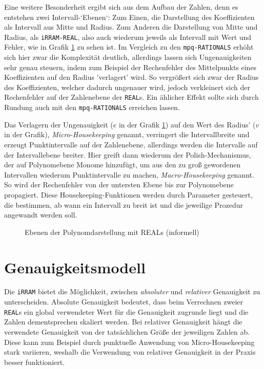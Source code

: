 Eine weitere Besonderheit ergibt sich aus dem Aufbau der Zahlen, denn es entstehen zwei Intervall-`Ebenen`: Zum Einen, die Darstellung des Koeffizienten als Intervall aus Mitte und Radius. Zum Anderen die Darstellung von Mitte und Radius, als \verb+iRRAM-REAL+, also auch wiederum jeweils als Intervall mit Wert und Fehler, wie in Grafik \ref{fig:levels} zu sehen ist. Im Vergleich zu den \verb+mpq-RATIONALS+ erhöht sich hier zwar die Komplexität deutlich, allerdings lassen sich Ungenauigkeiten sehr genau steuern, indem zum Beispiel der Rechenfehler des Mittelpunkts eines Koeffizienten auf den Radius 'verlagert' wird. So vergrößert sich zwar der Radius des Koeffizienten, welcher dadurch ungenauer wird, jedoch verkleinert sich der Rechenfehler auf der Zahlenebene der \verb+REAL+s. Ein ählicher Effekt sollte sich durch Rundung auch mit den \verb+mpq-RATIONALS+ erreichen lassen. 


Das Verlagern der Ungenauigkeit ($e$ in der Grafik \ref{fig:levels}) auf den Wert des Radius' ($v$ in der Grafik), \textit{Micro-Housekeeping} genannt, verringert die Intervallbreite und erzeugt Punktintervalle auf der Zahlenebene, allerdings werden die Intervalle auf der Intervallebene breiter. Hier greift dann wiederum der Polish-Mechanismus, der auf Polynomebene Monome hinzufügt, um aus den zu groß gewordenen Intervallen wiederum Punktintervalle zu machen, \textit{Macro-Housekeeping} genannt. So wird der Rechenfehler von der untersten Ebene bis zur Polynomebene propagiert.
Diese Housekeeping-Funktionen werden durch Parameter gesteuert, die bestimmen, ab wann ein Intervall zu breit ist und die jeweilige Prozedur angewandt werden soll.

\begin{figure}[ht]
\label{fig:levels}
\begin{center}
 
 
 \caption{Ebenen der Polynomdarstellung mit REALs (informell)}
 \end{center}
\end{figure}


\section{Genauigkeitsmodell}
\label{sec:precision}
Die \verb+iRRAM+ bietet die Möglichkeit, zwischen \textit{absoluter} und \textit{relativer} Genauigkeit zu unterscheiden. Absolute Genauigkeit bedeutet, dass beim Verrechnen zweier \verb+REAL+s ein global verwendeter Wert für die Genauigkeit zugrunde liegt und die Zahlen dementsprechen skaliert werden. Bei relativer Genauigkeit hängt die verwendete Genauigkeit von der tatsächlichen Größe der jeweiligen Zahlen ab. Diese kann zum Beispiel durch punktuelle Anwendung von Micro-Housekeeping stark variieren, weshalb die Verwendung von relativer Genauigkeit in der Praxis besser funktioniert.


